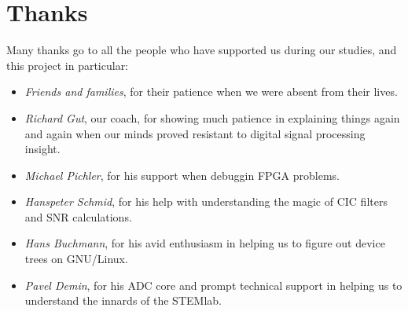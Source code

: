 %
%
\chapter*{Thanks} %
\label{ch:app:thanks}
\vspace{16em}

Many thanks go  to all the people  who have supported us  during our studies, 
and this project in particular:

\begin{itemize}
    \item[]\emph{Friends and families}, for their patience when we were absent
        from their lives.
    \item[]\emph{Richard  Gut},  our  coach,  for  showing  much  patience  in
        explaining things again  and again when our minds  proved resistant to
        digital signal processing insight.
    \item[]\emph{Michael Pichler}, for his support when debuggin FPGA problems.
    \item[]\emph{Hanspeter Schmid}, for his help with understanding the magic
        of CIC filters and SNR calculations.
    \item[]\emph{Hans Buchmann},  for his  avid enthusiasm  in helping  us to
        figure out device trees on GNU/Linux.
    \item[]\emph{Pavel Demin}, for his ADC core and prompt technical support
        in helping us to understand the innards of the STEMlab.
\end{itemize}

